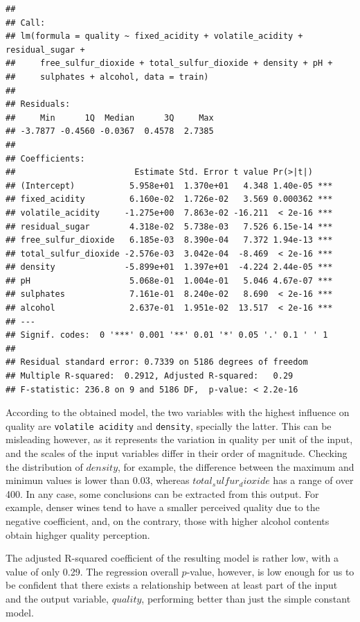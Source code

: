 \documentclass[12pt,]{article}
\begin{document}
\begin{verbatim}
## 
## Call:
## lm(formula = quality ~ fixed_acidity + volatile_acidity + residual_sugar + 
##     free_sulfur_dioxide + total_sulfur_dioxide + density + pH + 
##     sulphates + alcohol, data = train)
## 
## Residuals:
##     Min      1Q  Median      3Q     Max 
## -3.7877 -0.4560 -0.0367  0.4578  2.7385 
## 
## Coefficients:
##                        Estimate Std. Error t value Pr(>|t|)    
## (Intercept)           5.958e+01  1.370e+01   4.348 1.40e-05 ***
## fixed_acidity         6.160e-02  1.726e-02   3.569 0.000362 ***
## volatile_acidity     -1.275e+00  7.863e-02 -16.211  < 2e-16 ***
## residual_sugar        4.318e-02  5.738e-03   7.526 6.15e-14 ***
## free_sulfur_dioxide   6.185e-03  8.390e-04   7.372 1.94e-13 ***
## total_sulfur_dioxide -2.576e-03  3.042e-04  -8.469  < 2e-16 ***
## density              -5.899e+01  1.397e+01  -4.224 2.44e-05 ***
## pH                    5.068e-01  1.004e-01   5.046 4.67e-07 ***
## sulphates             7.161e-01  8.240e-02   8.690  < 2e-16 ***
## alcohol               2.637e-01  1.951e-02  13.517  < 2e-16 ***
## ---
## Signif. codes:  0 '***' 0.001 '**' 0.01 '*' 0.05 '.' 0.1 ' ' 1
## 
## Residual standard error: 0.7339 on 5186 degrees of freedom
## Multiple R-squared:  0.2912, Adjusted R-squared:   0.29 
## F-statistic: 236.8 on 9 and 5186 DF,  p-value: < 2.2e-16
\end{verbatim}

According to the obtained model, the two variables with the highest
influence on quality are \texttt{volatile\ acidity} and
\texttt{density}, specially the latter. This can be misleading however,
as it represents the variation in quality per unit of the input, and the
scales of the input variables differ in their order of magnitude.
Checking the distribution of \(density\), for example, the difference
between the maximum and minimun values is lower than 0.03, whereas
\(total_sulfur_dioxide\) has a range of over 400. In any case, some
conclusions can be extracted from this output. For example, denser wines
tend to have a smaller perceived quality due to the negative
coefficient, and, on the contrary, those with higher alcohol contents
obtain highger quality perception.

The adjusted R-squared coefficient of the resulting model is rather low,
with a value of only 0.29. The regression overall \(p\)-value, however,
is low enough for us to be confident that there exists a relationship
between at least part of the input and the output variable, \(quality\),
performing better than just the simple constant model.
\end{document}

